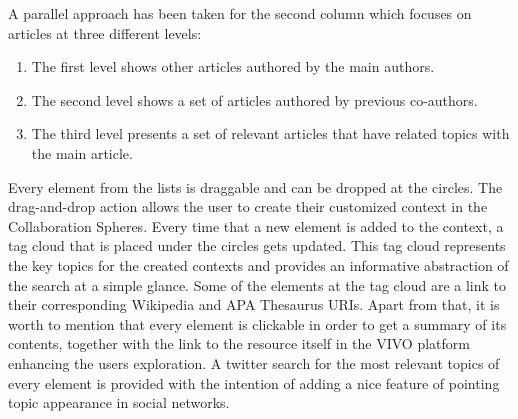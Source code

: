 A parallel approach has been taken for the second column which focuses on articles at three different levels:
\begin{enumerate}
  \item The first level shows other articles authored by the main authors.
  \item The second level shows  a set of articles authored by previous co-authors.
  \item The third level presents a set of relevant articles that have related topics with the main article.
\end{enumerate}  
Every element from the lists is draggable and can be dropped at the circles. The drag-and-drop action allows the user to create their customized context in the Collaboration Spheres.
Every time that a new element is added to the context, a tag cloud that is placed under the circles gets updated. This tag cloud represents the key topics for the created contexts and provides an informative abstraction of the search at a simple glance. Some of the elements at the tag cloud are a link to their corresponding Wikipedia and APA Thesaurus URIs.
Apart from that, it is worth to mention that every element is clickable in order to get a summary of its contents, together with the link to the resource itself in the VIVO platform enhancing the users exploration. A twitter search for the most relevant topics of every element is provided with the intention of adding a nice feature of pointing topic appearance in social networks.\\

